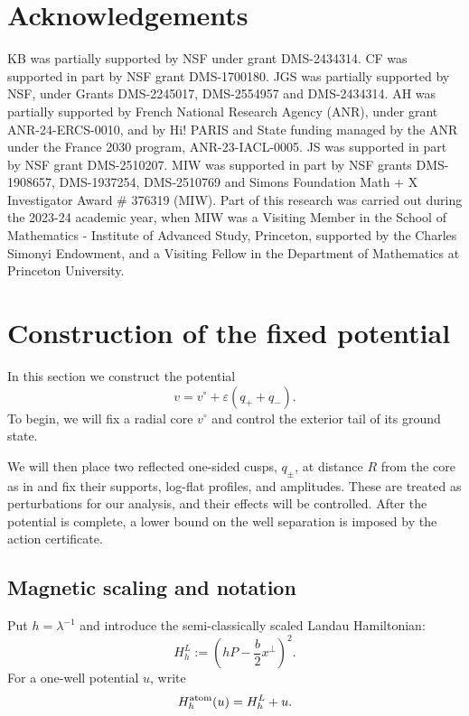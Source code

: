 \documentclass[11pt]{article}
\newcommand{\eps}{\varepsilon}
\begin{document}
\section*{Acknowledgements}
KB was partially supported by NSF under grant DMS-2434314. CF was supported in part by NSF grant DMS-1700180. JGS was partially supported by NSF, under Grants DMS-2245017,
DMS-2554957 and DMS-2434314. AH was partially supported by French National Research Agency (ANR), under grant ANR-24-ERCS-0010, and by Hi! PARIS and State funding managed by the ANR under the France 2030 program, ANR-23-IACL-0005. JS was supported in part by NSF grant DMS-2510207. MIW was supported in part by NSF grants DMS-1908657, DMS-1937254, DMS-2510769  and Simons Foundation Math + X Investigator Award \# 376319 (MIW). Part of this research was carried out during the 2023-24 academic year, when MIW was a Visiting Member in the School of Mathematics - Institute of Advanced Study, Princeton, supported by the Charles Simonyi Endowment, and a Visiting Fellow in the Department of Mathematics at Princeton University.

\section{Construction of the fixed potential}\label{sec:construction}

In this section we construct the potential
\begin{equation}\label{eq:voverview}
 v=v^\circ+\eps(q_++q_-).
\end{equation}
To begin, we will fix a radial core $v^\circ$ and control the exterior tail of its ground state.

We {will} then place two reflected one-sided cusps, $q_\pm$, at distance $R$ from the
core {as in } and fix their supports, log-flat profiles, and amplitudes.  These are treated as perturbations for our analysis, and their effects will be controlled. After the potential is
complete, a lower bound on the well separation is imposed by the action
certificate.

\subsection{Magnetic scaling and notation}\label{sec:framework}
Put $h=\lambda^{-1}$ and {introduce the semi-classically scaled Landau Hamiltonian}:
\begin{equation}\label{eq:Dh}
 H_h^L:=\left(hP-\frac b2x^\perp\right)^2.
\end{equation}
For a one-well potential $u$, write
\[
 H_h^{\rm atom}(u)=H_h^L+u.
\]
\end{document}
